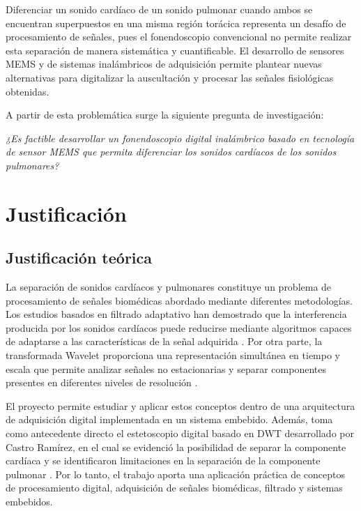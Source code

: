 Diferenciar un sonido cardíaco de un sonido pulmonar cuando ambos se encuentran superpuestos en una misma región torácica representa un desafío de procesamiento de señales, pues el fonendoscopio convencional no permite realizar esta separación de manera sistemática y cuantificable. El desarrollo de sensores MEMS y de sistemas inalámbricos de adquisición permite plantear nuevas alternativas para digitalizar la auscultación y procesar las señales fisiológicas obtenidas.

A partir de esta problemática surge la siguiente pregunta de investigación:

\begin{center}
\emph{¿Es factible desarrollar un fonendoscopio digital inalámbrico basado en tecnología de sensor MEMS que permita diferenciar los sonidos cardíacos de los sonidos pulmonares?}
\end{center}

\section{Justificación}\label{justificacion}

\subsection{Justificación teórica}

La separación de sonidos cardíacos y pulmonares constituye un problema de procesamiento de señales biomédicas abordado mediante diferentes metodologías. Los estudios basados en filtrado adaptativo han demostrado que la interferencia producida por los sonidos cardíacos puede reducirse mediante algoritmos capaces de adaptarse a las características de la señal adquirida . Por otra parte, la transformada Wavelet proporciona una representación simultánea en tiempo y escala que permite analizar señales no estacionarias y separar componentes presentes en diferentes niveles de resolución .

El proyecto permite estudiar y aplicar estos conceptos dentro de una arquitectura de adquisición digital implementada en un sistema embebido. Además, toma como antecedente directo el estetoscopio digital basado en DWT desarrollado por Castro Ramírez, en el cual se evidenció la posibilidad de separar la componente cardíaca y se identificaron limitaciones en la separación de la componente pulmonar . Por lo tanto, el trabajo aporta una aplicación práctica de conceptos de procesamiento digital, adquisición de señales biomédicas, filtrado y sistemas embebidos.

